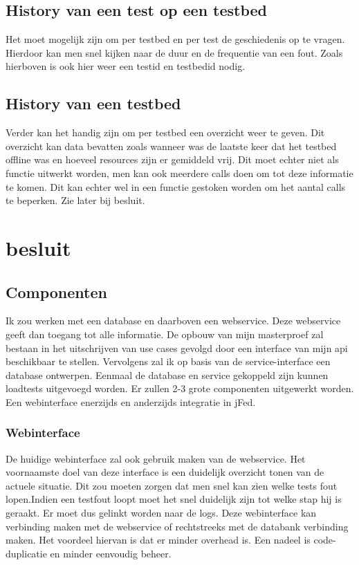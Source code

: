 \documentclass[11pt]{article}
\begin{document}
\subsection{History van een test op een testbed}
Het moet mogelijk zijn om per testbed en per test de geschiedenis op te vragen.
Hierdoor kan men snel kijken naar de duur en de frequentie van een fout.
Zoals hierboven is ook hier weer een testid en testbedid nodig.

\subsection{History van een testbed}
Verder kan het handig zijn om per testbed een overzicht weer te geven. Dit overzicht kan data bevatten zoals wanneer was de laatste keer dat het testbed offline was en hoeveel resources zijn er gemiddeld vrij. Dit moet echter niet als functie uitwerkt worden, men kan ook meerdere calls doen om tot deze informatie te komen. Dit kan echter wel in een functie gestoken worden om het aantal calls te beperken. Zie later bij besluit.

\clearpage
\section{besluit}
\subsection{Componenten}
Ik zou werken met een database en daarboven een webservice. Deze webservice geeft dan toegang tot alle informatie. De opbouw van mijn masterproef zal bestaan in het uitschrijven van use cases gevolgd door een interface van mijn api beschikbaar te stellen. Vervolgens zal ik op basis van de service-interface een database ontwerpen. Eenmaal de database en service gekoppeld zijn kunnen loadtests uitgevoegd worden. Er zullen 2-3 grote componenten uitgewerkt worden. Een webinterface enerzijds en anderzijds integratie in jFed.
\subsubsection{Webinterface}
De huidige webinterface zal ook gebruik maken van de webservice. Het voornaamste doel van deze interface is een duidelijk overzicht tonen van de actuele situatie. Dit zou moeten zorgen dat men snel kan zien welke tests fout lopen.Indien een testfout loopt moet het snel duidelijk zijn tot welke stap hij is geraakt. Er moet dus gelinkt worden naar de logs. Deze webinterface kan verbinding maken met de webservice of rechtstreeks met de databank verbinding maken. Het voordeel hiervan is dat er minder overhead is. Een nadeel is code-duplicatie en minder eenvoudig beheer.
\end{document}
